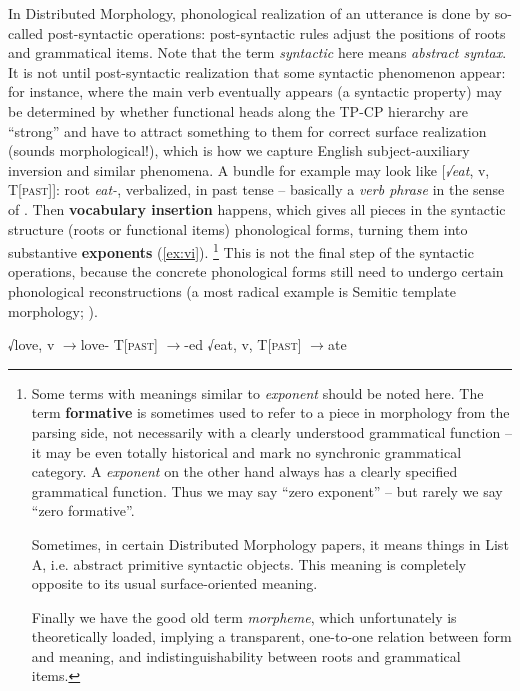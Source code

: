 \documentclass[a4paper, oneside, scheme=plain, 12pt]{article}
\newcommand*{\textto}{$\to$}
\newcommand*{\concept}[1]{\textbf{#1}}
\newcommand*{\term}[1]{\emph{#1}}
\newcommand{\form}[1]{\emph{#1}}
\newcommand*{\category}[1]{\textsc{#1}}
\begin{document}
In Distributed Morphology, phonological realization of an utterance
is done by so-called post-syntactic operations:
post-syntactic rules adjust the positions of roots and grammatical items.
Note that the term \term{syntactic} here means \emph{abstract syntax}.
It is not until post-syntactic realization that some syntactic phenomenon appear:
for instance, where the main verb eventually appears (a syntactic property) may be determined by
whether functional heads along the TP-CP hierarchy are ``strong''
and have to attract something to them for correct surface realization
(sounds morphological!),
which is how we capture English subject-auxiliary inversion and similar phenomena.
A bundle for example may look like [\form{√eat}, v, T[\category{past}]]:
root \form{eat-}, verbalized, in past tense -- basically a \term{verb phrase}
in the sense of .
Then \concept{vocabulary insertion} happens,
which gives all pieces in the syntactic structure (roots or functional items) phonological forms,
turning them into substantive \concept{exponents} (\ref{ex:vi}).%
\footnote{
    Some terms with meanings similar to \term{exponent} should be noted here.
    The term \concept{formative} is sometimes used to refer to a piece in morphology from the parsing side, not necessarily with a clearly understood grammatical function --
    it may be even totally historical and mark no synchronic grammatical category.
    A \term{exponent} on the other hand always has a clearly specified grammatical function.
    Thus we may say ``zero exponent'' -- but rarely we say ``zero formative''.

    Sometimes, in certain Distributed Morphology papers, it means things in List A,
    i.e. abstract primitive syntactic objects. 
    This meaning is completely opposite to its usual surface-oriented meaning.

    Finally we have the good old term \term{morpheme},
    which unfortunately is theoretically loaded, implying a transparent,
    one-to-one relation between form and meaning,
    and indistinguishability between roots and grammatical items.
}
This is not the final step of the syntactic operations,
because the concrete phonological forms still need to undergo certain phonological reconstructions
(a most radical example is Semitic template morphology; \citealt{tucker2011morphosyntax}).

\begin{exe}
    \ex\label{ex:vi} \begin{xlist}
        \ex √love, v \textto love-
        \ex T[\category{past}] \textto -ed
        \ex √eat, v, T[\category{past}] \textto ate
    \end{xlist}
\end{exe}
\end{document}
